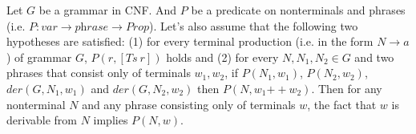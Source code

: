 %

\begin{lemma}
	Let $G$ be a grammar in CNF. And $P$ be a predicate on nonterminals and phrases (i.e. $P: var \to \textit{phrase} \to \textit{Prop}$).
	Let's also assume that the following two hypotheses are satisfied:
	(1) for every terminal production (i.e. in the form $N \to a$) of grammar $G$, $P(r, [Ts \ r])$ holds and (2) for every $N, N_1, N_2 \in G$ and two phrases that consist only of terminals $w_1, w_2$, if $P(N_1, w_1)$, $P(N_2, w_2)$, $der(G, N_1, w_1)$ and $der(G, N_2, w_2)$ then $P(N, w_1 \mathbin{++} w_2)$.
	Then for any nonterminal $N$ and any phrase consisting only of terminals $w$, the fact that $w$ is derivable from $N$ implies $P(N,w)$.
\end{lemma}

%
%

